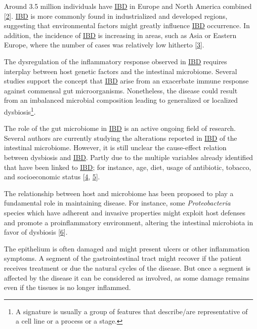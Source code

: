 \documentclass[
  12pt,
  a4paper,
  twoside,
  openright]{book}
\begin{document}
Around 3.5 million individuals have \protect\hyperlink{acronyms_IBD}{IBD} in Europe and North America combined {[}\protect\hyperlink{ref-jairath2020}{2}{]}.
\protect\hyperlink{acronyms_IBD}{IBD} is more commonly found in industrialized and developed regions, suggesting that environmental factors might greatly influence \protect\hyperlink{acronyms_IBD}{IBD} occurrence.
In addition, the incidence of \protect\hyperlink{acronyms_IBD}{IBD} is increasing in areas, such as Asia or Eastern Europe, where the number of cases was relatively low hitherto {[}\protect\hyperlink{ref-burisch2015}{3}{]}.

The dysregulation of the inflammatory response observed in \protect\hyperlink{acronyms_IBD}{IBD} requires interplay between host genetic factors and the intestinal microbiome.
Several studies support the concept that \protect\hyperlink{acronyms_IBD}{IBD} arise from an exacerbate immune response against commensal gut microorganisms.
Nonetheless, the disease could result from an imbalanced microbial composition leading to generalized or localized dysbiosis\footnote{A signature is usually a group of features that describe/are representative of a cell line or a process or a stage.}.

The role of the gut microbiome in \protect\hyperlink{acronyms_IBD}{IBD} is an active ongoing field of research.
Several authors are currently studying the alterations reported in \protect\hyperlink{acronyms_IBD}{IBD} of the intestinal microbiome.
However, it is still unclear the cause-effect relation between dysbiosis and \protect\hyperlink{acronyms_IBD}{IBD}.
Partly due to the multiple variables already identified that have been linked to \protect\hyperlink{acronyms_IBD}{IBD}; for instance, age, diet, usage of antibiotic, tobacco, and socioeconomic status {[}\protect\hyperlink{ref-humanmicrobiomeprojectconsortium2012}{4}, \protect\hyperlink{ref-shaw2016}{5}{]}.

The relationship between host and microbiome has been proposed to play a fundamental role in maintaining disease.
For instance, some \emph{Proteobacteria} species which have adherent and invasive properties might exploit host defenses and promote a proinflammatory environment, altering the intestinal microbiota in favor of dysbiosis {[}\protect\hyperlink{ref-mukhopadhya2012}{6}{]}.

The epithelium is often damaged and might present ulcers or other inflammation symptoms.
A segment of the gastrointestinal tract might recover if the patient receives treatment or due the natural cycles of the disease.
But once a segment is affected by the disease it can be considered as involved, as some damage remains even if the tissues is no longer inflammed.
\end{document}
